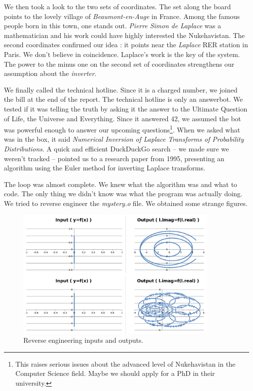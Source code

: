 \documentclass[11pt,a4paper]{article}
\begin{document}
We then took a look to the two sets of coordinates. The set along the board points to the lovely village of \textit{Beaumont-en-Auge} in France. Among the famous people born in this town, one stands out. \textit{Pierre Simon de Laplace} was a mathematician and his work could have highly interested the Nukehavistan. The second coordinates confirmed our idea : it points near the \textit{Laplace} RER station in Paris. We don't believe in coincidence. Laplace's work is the key of the system. The power to the minus one on the second set of coordinates strengthens our assumption about the \textit{inverter}.

We finally called the technical hotline. Since it is a charged number, we joined the bill at the end of the report. The technical hotline is only an answerbot. We tested if it was telling the truth by asking it the answer to the Ultimate Question of Life, the Universe and Everything. Since it answered 42, we assumed the bot was powerful enough to answer our upcoming questions\footnote{This raises serious issues about the advanced level of Nukehavistan in the Computer Science field. Maybe we should apply for a PhD in their university.}. When we asked what was in the box, it said \textit{Numerical Inversion of Laplace Transforms of Probability Distributions}. A quick and efficient DuckDuckGo search -- we made sure we weren't tracked -- pointed us to a research paper from 1995, presenting an algorithm using the Euler method for inverting Laplace transforms.

The loop was almost complete. We knew what the algorithm was and what to code. The only thing we didn't know was what the program was actually doing. We tried to reverse engineer the \textit{mystery.o} file. We obtained some strange figures.

\begin{figure}[!h]
\centering
\includegraphics[width=10cm]{outputs.png}
\caption{Reverse engineering inputs and outputs.}
\label{reverse}
\end{figure}
\end{document}
